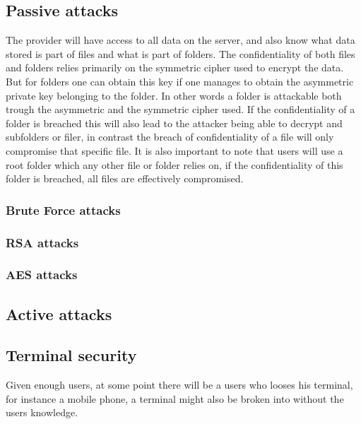 \documentclass[pdftex,english,10pt,b5paper,twoside]{book}
\begin{document}
\subsection{Passive attacks}
The provider will have access to all data on the server, and also know what
data stored is part of files and what is part of folders. The confidentiality
of both files and folders relies primarily on the symmetric cipher used to
encrypt the data. But for folders one can obtain this key if one manages to
obtain the asymmetric private key belonging to the folder. In other words a
folder is attackable both trough the asymmetric and the symmetric cipher used.
If the confidentiality of a folder is breached this will also lead to the
attacker being able to decrypt and subfolders or filer, in contrast the breach
of confidentiality of a file will only compromise that specific file. It is
also important to note that users will use a root folder which any other file
or folder relies on, if the confidentiality of this folder is breached, all
files are effectively compromised.

\subsubsection{Brute Force attacks}

\subsubsection{RSA attacks}

\subsubsection{AES attacks}

\subsection{Active attacks}


\subsection{Terminal security}
Given enough users, at some point there will be a users who looses his
terminal, for instance a mobile phone, a terminal might also be broken into
without the users knowledge. 
\end{document}

